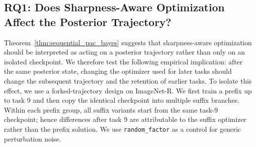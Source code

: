 \documentclass{article}
\begin{document}

\subsection{RQ1: Does Sharpness-Aware Optimization Affect the Posterior Trajectory?}
\label{sec:rq1_trajectory}

Theorem~\ref{thm:sequential_pac_bayes} suggests that sharpness-aware optimization should be interpreted as acting on a posterior trajectory rather than only on an isolated checkpoint.
We therefore test the following empirical implication: after the same posterior state, changing the optimizer used for later tasks should change the subsequent trajectory and the retention of earlier tasks.
To isolate this effect, we use a forked-trajectory design on ImageNet-R.
We first train a prefix up to task 9 and then copy the identical checkpoint into multiple suffix branches.
Within each prefix group, all suffix variants start from the same task-9 checkpoint; hence differences after task 9 are attributable to the suffix optimizer rather than the prefix solution.
We use \texttt{random_factor} as a control for generic perturbation noise.
\end{document}
